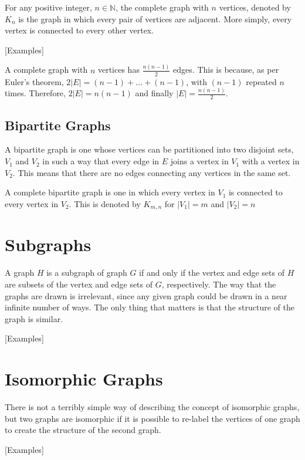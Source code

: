 For any positive integer, $n \in \mathbb{N}$, the complete graph with $n$ vertices, denoted by $K_n$ is the graph in
 which every pair of vertices are adjacent. More simply, every vertex is connected to every other vertex.

[Examples]

A complete graph with $n$ vertices has $\frac{n(n - 1)}{2}$ edges. This is because, as per Euler's theorem,
 $2 \lvert E \rvert = (n - 1) + \ldots + (n - 1)$, with $(n - 1)$ repeated $n$ times. Therefore,
 $2 \lvert E \rvert = n(n - 1)$ and finally $\lvert E \rvert = \frac{n(n - 1)}{2}$.

\subsection*{Bipartite Graphs}

A bipartite graph is one whose vertices can be partitioned into two disjoint sets, $V_1$ and $V_2$ in such a way that
 every edge in $E$ joins a vertex in $V_1$ with a vertex in $V_2$. This means that there are no edges connecting any
 vertices in the same set.

A complete bipartite graph is one in which every vertex in $V_1$ is connected to every vertex in $V_2$. This is denoted
 by $K_{m, n}$ for $\lvert V_1 \rvert = m$ and $\lvert V_2 \rvert = n$

\section*{Subgraphs}

A graph $H$ is a subgraph of graph $G$ if and only if the vertex and edge sets of $H$ are subsets of the vertex and edge
 sets of $G$, respectively. The way that the graphs are drawn is irrelevant, since any given graph could be drawn in a
 near infinite number of ways. The only thing that matters is that the structure of the graph is similar.

[Examples]

\section*{Isomorphic Graphs}

There is not a terribly simple way of describing the concept of isomorphic graphs, but two graphs are isomorphic if it
 is possible to re-label the vertices of one graph to create the structure of the second graph.

[Examples]

